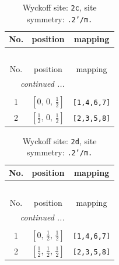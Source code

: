 \documentclass[fleqn,8pt]{jsarticle}
\begin{document}
\begin{longtable}{ccc}
\caption{Wyckoff site: {\tt 2c}, site symmetry: {\tt .2'/m.}}
 \\
 \hline \hline
No. & position & mapping \\ \hline \endfirsthead

\multicolumn{2}{l}{\tablename\ \thetable{}} \\
 \hline \hline
No. & position & mapping \\ \hline \endhead

 \hline \hline
\multicolumn{2}{r}{\footnotesize\it continued ...} \\ \endfoot

 \hline \hline
\multicolumn{2}{r}{} \\ \endlastfoot

1 & $\left[ 0,\, 0,\, \frac{1}{2} \right]$ & {\tt [1,4,6,7]} \\ \hline
2 & $\left[ \frac{1}{2},\, 0,\, \frac{1}{2} \right]$ & {\tt [2,3,5,8]} \\
\end{longtable}
\renewcommand{\arraystretch}{1.2}
\begin{longtable}{ccc}
\caption{Wyckoff site: {\tt 2d}, site symmetry: {\tt .2'/m.}}
 \\
 \hline \hline
No. & position & mapping \\ \hline \endfirsthead

\multicolumn{2}{l}{\tablename\ \thetable{}} \\
 \hline \hline
No. & position & mapping \\ \hline \endhead

 \hline \hline
\multicolumn{2}{r}{\footnotesize\it continued ...} \\ \endfoot

 \hline \hline
\multicolumn{2}{r}{} \\ \endlastfoot

1 & $\left[ 0,\, \frac{1}{2},\, \frac{1}{2} \right]$ & {\tt [1,4,6,7]} \\ \hline
2 & $\left[ \frac{1}{2},\, \frac{1}{2},\, \frac{1}{2} \right]$ & {\tt [2,3,5,8]} \\
\end{longtable}
\renewcommand{\arraystretch}{1.2}
\end{document}
